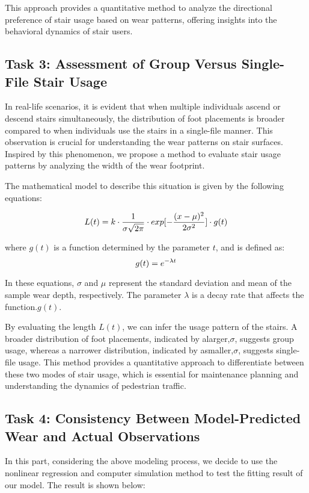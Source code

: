 \documentclass{mcmthesis}
\begin{document}
This approach provides a quantitative method to analyze the directional preference of stair usage based on wear patterns, offering insights into the behavioral dynamics of stair users.

\subsection{Task 3: Assessment of Group Versus Single-File Stair Usage}

\hspace{1.5em}In real-life scenarios, it is evident that when multiple individuals ascend or descend stairs simultaneously, the distribution of foot placements is broader compared to when individuals use the stairs in a single-file manner. This observation is crucial for understanding the wear patterns on stair surfaces. Inspired by this phenomenon, we propose a method to evaluate stair usage patterns by analyzing the width of the wear footprint.

The mathematical model to describe this situation is given by the following equations:

\begin{equation}
\label{eq9}
\hfill L(t) = k \cdot \frac{1}{\sigma\sqrt{2\pi}} \cdot exp[-\frac{(x-\mu)^2}{2\sigma^2}]\cdot g(t)
\end{equation}

where \( g(t) \) is a function determined by the parameter \( t \), and is defined as:
\begin{equation}
\label{eq10}
\hfill g(t) = e^{-\lambda t}
\end{equation}

In these equations, \( \sigma \) and \( \mu \) represent the standard deviation and mean of the sample wear depth, respectively. The parameter \( \lambda \) is a decay rate that affects the function.\( g(t) \).

By evaluating the length \( L(t) \), we can infer the usage pattern of the stairs. A broader distribution of foot placements, indicated by alarger,\( \sigma \), suggests group usage, whereas a narrower distribution, indicated by asmaller,\( \sigma \), suggests single-file usage. This method provides a quantitative approach to differentiate between these two modes of stair usage, which is essential for maintenance planning and understanding the dynamics of pedestrian traffic.

\subsection{Task 4: Consistency Between Model-Predicted Wear and Actual Observations}
\hspace{1.5em}In this part, considering the above modeling process, we decide to use the nonlinear regression and computer simulation method to test the fitting result of our model. The result is shown below:
\end{document}
